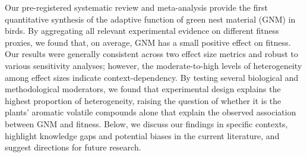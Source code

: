 \documentclass[
  number,
  review,
  onecolumn]{elsarticle}
\begin{document}
Our pre-registered systematic review and meta-analysis provide the first
quantitative synthesis of the adaptive function of green nest material
(GNM) in birds. By aggregating all relevant experimental evidence on
different fitness proxies, we found that, on average, GNM has a small
positive effect on fitness. Our results were generally consistent across
two effect size metrics and robust to various sensitivity analyses;
however, the moderate-to-high levels of heterogeneity among effect sizes
indicate context-dependency. By testing several biological and
methodological moderators, we found that experimental design explains
the highest proportion of heterogeneity, raising the question of whether
it is the plants' aromatic volatile compounds alone that explain the
observed association between GNM and fitness. Below, we discuss our
findings in specific contexts, highlight knowledge gaps and potential
biases in the current literature, and suggest directions for future
research.
\end{document}
